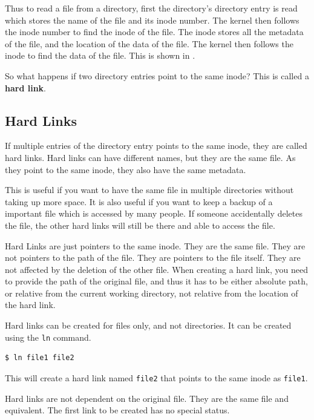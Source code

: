 Thus to read a file from a directory, first the directory's directory entry is read which stores the name of the file and its inode number.
The kernel then follows the inode number to find the inode of the file.
The inode stores all the metadata of the file, and the location of the data of the file.
The kernel then follows the inode to find the data of the file.
This is shown in .

So what happens if two directory entries point to the same inode?
This is called a \textbf{hard link}.

\subsection{Hard Links}

If multiple entries of the directory entry points to the same inode, they are called hard links.
Hard links can have different names, but they are the same file.
As they point to the same inode, they also have the same metadata.

This is useful if you want to have the same file in multiple directories without taking up more space.
It is also useful if you want to keep a backup of a important file which is accessed by many people.
If someone accidentally deletes the file, the other hard links will still be there and able to access the file.

\begin{definition}
  Hard Links are just pointers to the same inode. They are the same file.
  They are not pointers to the path of the file. They are pointers to the
  file itself. They are not affected by the deletion of the other file.
  When creating a hard link, you need to provide the path of the original
  file, and thus it has to be either absolute path, or relative from the
  current working directory, not relative from the location of the hard link.
\end{definition}

Hard links can be created for files only, and not directories.
It can be created using the \texttt{ln} command.

\begin{lstlisting}[language=bash]
$ ln file1 file2
\end{lstlisting}

This will create a hard link named \texttt{file2} that points to the same inode as \texttt{file1}.

\begin{remark}
  Hard links are not dependent on the original file.
  They are the same file and equivalent.
  The first link to be created has no special status.
\end{remark}

